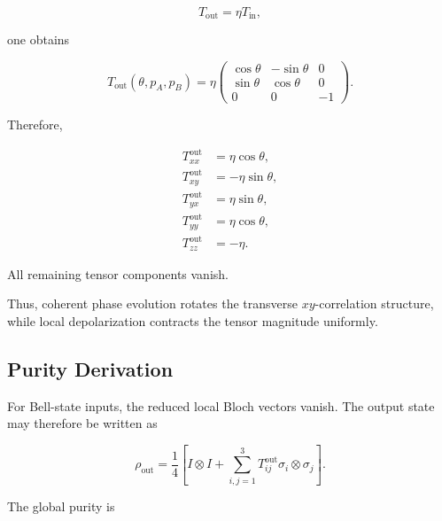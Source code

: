 \begin{equation}
T_{\mathrm{out}}
=
\eta
T_{\mathrm{in}},
\end{equation}

one obtains

\begin{equation}
T_{\mathrm{out}}(\theta,p_A,p_B)
=
\eta
\begin{pmatrix}
\cos\theta & -\sin\theta & 0 \\
\sin\theta & \cos\theta & 0 \\
0 & 0 & -1
\end{pmatrix}.
\label{eq:d5_output_tensor}
\end{equation}

Therefore,

\begin{align}
T_{xx}^{\mathrm{out}}
&=
\eta\cos\theta,
\\
T_{xy}^{\mathrm{out}}
&=
-\eta\sin\theta,
\\
T_{yx}^{\mathrm{out}}
&=
\eta\sin\theta,
\\
T_{yy}^{\mathrm{out}}
&=
\eta\cos\theta,
\\
T_{zz}^{\mathrm{out}}
&=
-\eta.
\end{align}

All remaining tensor components vanish.

\medskip

Thus, coherent phase evolution rotates the transverse \(xy\)-correlation structure, while local depolarization contracts the tensor magnitude uniformly.

\medskip


\subsection{Purity Derivation}

For Bell-state inputs, the reduced local Bloch vectors vanish. The output state may therefore be written as

\begin{equation}
\rho_{\mathrm{out}}
=
\frac{1}{4}
\left[
I\otimes I
+
\sum_{i,j=1}^{3}
T_{ij}^{\mathrm{out}}
\sigma_i\otimes\sigma_j
\right].
\label{eq:d5_pauli_density_expansion}
\end{equation}

The global purity is

